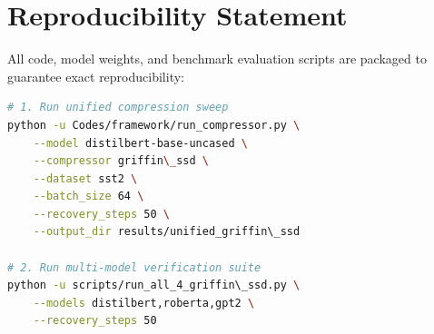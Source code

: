 \section{Reproducibility Statement}
All code, model weights, and benchmark evaluation scripts are packaged to guarantee exact reproducibility:
\begin{lstlisting}[language=bash]
# 1. Run unified compression sweep
python -u Codes/framework/run_compressor.py \
    --model distilbert-base-uncased \
    --compressor griffin\_ssd \
    --dataset sst2 \
    --batch_size 64 \
    --recovery_steps 50 \
    --output_dir results/unified_griffin\_ssd

# 2. Run multi-model verification suite
python -u scripts/run_all_4_griffin\_ssd.py \
    --models distilbert,roberta,gpt2 \
    --recovery_steps 50
\end{lstlisting}
